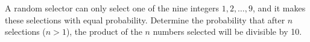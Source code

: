 A random selector can only select one of the nine integers $ 1,2,\ldots,9$,  and it makes these selections with equal probability. Determine the probability that after $ n$ selections ($ n>1$), the product of the $ n$ numbers selected will be divisible by 10.